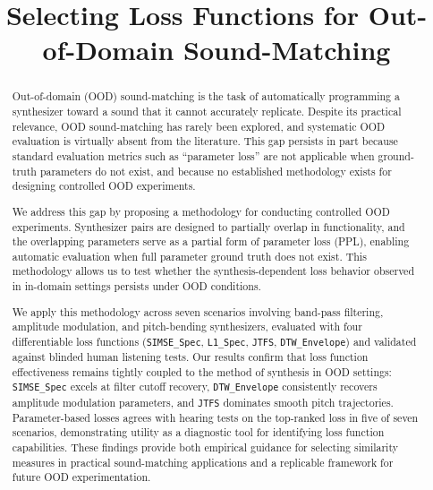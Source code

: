 \documentclass[10pt]{article} %
\title{Selecting Loss Functions for Out-of-Domain Sound-Matching}
\newcommand{\SIMSESpec}{\texttt{SIMSE\_\allowbreak Spec}\xspace}
\newcommand{\LoneSpec}{\texttt{L1\_\allowbreak Spec}\xspace}
\newcommand{\JTFS}{\texttt{JTFS}\xspace}
\newcommand{\DTWEnv}{\texttt{DTW\_\allowbreak Envelope}\xspace}
\begin{document}
\address{University of Alberta}

\maketitle



\begin{abstract}


Out-of-domain (OOD) sound-matching is the task of automatically programming a synthesizer toward a sound that it cannot accurately replicate. Despite its practical relevance, OOD sound-matching has rarely been explored, and systematic OOD evaluation is virtually absent from the literature. This gap persists in part because standard evaluation metrics such as ``parameter loss'' are not applicable when ground-truth parameters do not exist, and because no established methodology exists for designing controlled OOD experiments. 

We address this gap by proposing a methodology for conducting controlled OOD experiments. Synthesizer pairs are designed to partially overlap in functionality, and the overlapping parameters serve as a partial form of parameter loss (PPL), enabling automatic evaluation when full parameter ground truth does not exist. This methodology allows us to test whether the synthesis-dependent loss behavior observed in in-domain settings persists under OOD conditions.

We apply this methodology across seven scenarios involving band-pass filtering, amplitude modulation, and pitch-bending synthesizers, evaluated with four differentiable loss functions (\SIMSESpec, \LoneSpec, \JTFS, \DTWEnv) and validated against blinded human listening tests. Our results confirm that loss function effectiveness remains tightly coupled to the method of synthesis in OOD settings: \SIMSESpec excels at filter cutoff recovery, \DTWEnv consistently recovers amplitude modulation parameters, and \JTFS dominates smooth pitch trajectories. Parameter-based losses agrees with hearing tests on the top-ranked loss in five of seven scenarios, demonstrating utility as a diagnostic tool for identifying loss function capabilities. These findings provide both empirical guidance for selecting similarity measures in practical sound-matching applications and a replicable framework for future OOD experimentation.

\end{abstract}
\end{document}

